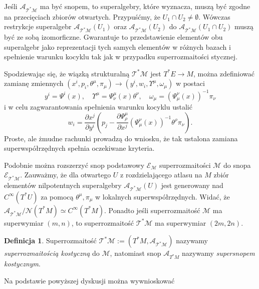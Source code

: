 \documentclass[11pt,a4paper]{report}
\theoremstyle{definition}
\newtheorem{definition}[theorem]{Definicja}
\begin{document}
Jeśli $\mathcal{A_{T^*M}}$ ma być snopem, to superalgebry, które wyznacza, muszą być zgodne na przecięciach zbiorów otwartych. Przypuśćmy, że $U_1 \cap U_2 \neq \emptyset$. Wówczas restrykcje superalgebr $\mathcal{A_{T^*M}}(U_1)$ oraz $\mathcal{A_{T^*M}}(U_2)$ do $\mathcal{A_{T^*M}}(U_1 \cap U_2)$ muszą być ze sobą izomorficzne. Gwarantuje to przedstawienie elementów obu superalgebr jako reprezentacji tych samych elementów w różnych bazach i spełnienie warunku kocyklu tak jak w przypadku superrozmaitości stycznej.
		      			
Spodziewając się, że wiązką strukturalną $\mathcal{T^*M}$ jest $T^*E \rightarrow M$, można zdefiniować zamianę zmiennych $(x^i, p_i, \theta^\mu, \pi_\mu) \rightarrow (y^i, w_i, \Upsilon^\mu, \omega_\mu)$ w postaci
\begin{equation}
	\label{eq:M1}
	y^i=\Psi^i(x),\quad \Upsilon^\mu=\Psi^\mu_\nu(x)\theta^\nu, \quad
	\omega_\mu =(\Psi_\mu^\nu(x))^{-1} \pi_\nu
\end{equation}
i w celu zagwarantowania spełnienia warunku kocyklu ustalić
\begin{equation}
	\label{eq:M2}
	w_i =\frac{\partial x^j}{\partial y^i}\left(p_j-\frac{\partial \Psi^\mu_\rho}{\partial x^j}(\Psi^\nu_\mu (x))^{-1} \theta^\rho \pi_\nu\right).
\end{equation}
Proste, ale żmudne rachunki prowadzą do wniosku, że tak ustalona zamiana superwspółrzędnych spełnia oczekiwane kryteria.
		      			
Podobnie można rozszerzyć snop podstawowy $\mathcal{E_M}$ superrozmaitości $\mathcal{M}$ do snopa $\mathcal{E_{T^*M}}$. Zauważmy, że dla otwartego $U$ z rozdzielającego atlasu na $M$ zbiór elementów nilpotentnych superalgebry $\mathcal{A_{T^*M}}(U)$ jest generowany nad $C^\infty(T^*U)$ za pomocą $\theta^\mu, \pi_\mu$ w lokalnych superwspółrzędnych. Widać, że $\mathcal{A_{T^*M}}/\mathcal{N}(T^*M) \simeq C^\infty(T^*M)$. Ponadto jeśli superrozmaitość $\mathcal{M}$ ma superwymiar $(m,n)$, to superrozmaitość $\mathcal{T^*M}$ ma superwymiar $(2m,2n)$.
		      			
\begin{definition}
	Superrozmaitość $\mathcal{T^*M} := (T^*M, \mathcal{A_{T^*M}})$ nazywamy \textit{superrozmaitością kostyczną} do $\mathcal{M}$, natomiast snop $\mathcal{A}_{T^*M}$ nazywamy \textit{supersnopem kostycznym}.
\end{definition}
		      			
Na podstawie powyższej dyskusji można wywnioskować
		      			
\end{document}
